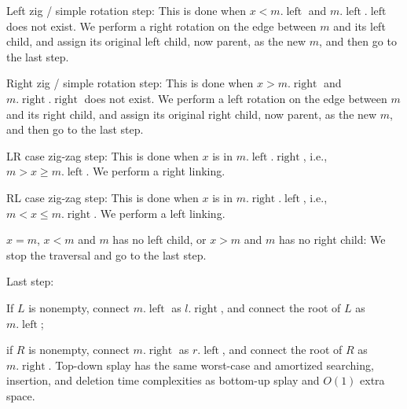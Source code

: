 \documentclass[a4paper,12pt]{article}
\begin{document}
\item Left zig / simple rotation step: This is done when $x<m.\operatorname{left}$ and $m.\operatorname{left}.\operatorname{left}$ does not exist. We perform a right rotation on the edge between $m$ and its left child, and assign its original left child, now parent, as the new $m$, and then go to the last step.
\item Right zig / simple rotation step: This is done when $x>m.\operatorname{right}$ and $m.\operatorname{right}.\operatorname{right}$ does not exist. We perform a left rotation on the edge between $m$ and its right child, and assign its original right child, now parent, as the new $m$, and then go to the last step.
\item LR case zig-zag step: This is done when $x$ is in $m.\operatorname{left}.\operatorname{right}$, i.e., $m>x\ge m.\operatorname{left}$. We perform a right linking.
\item RL case zig-zag step: This is done when $x$ is in $m.\operatorname{right}.\operatorname{left}$, i.e., $m<x\le m.\operatorname{right}$. We perform a left linking.
\item $x=m$, $x<m$ and $m$ has no left child, or $x>m$ and $m$ has no right child: We stop the traversal and go to the last step.
\item Last step:
\bit
\item If $L$ is nonempty, connect $m.\operatorname{left}$ as $l.\operatorname{right}$, and connect the root of $L$ as $m.\operatorname{left}$;
\item if $R$ is nonempty, connect $m.\operatorname{right}$ as $r.\operatorname{left}$, and connect the root of $R$ as $m.\operatorname{right}$.
\eit
\eit
Top-down splay has the same worst-case and amortized searching, insertion, and deletion time complexities as bottom-up splay and $O(1)$ extra space.

\end{document}

